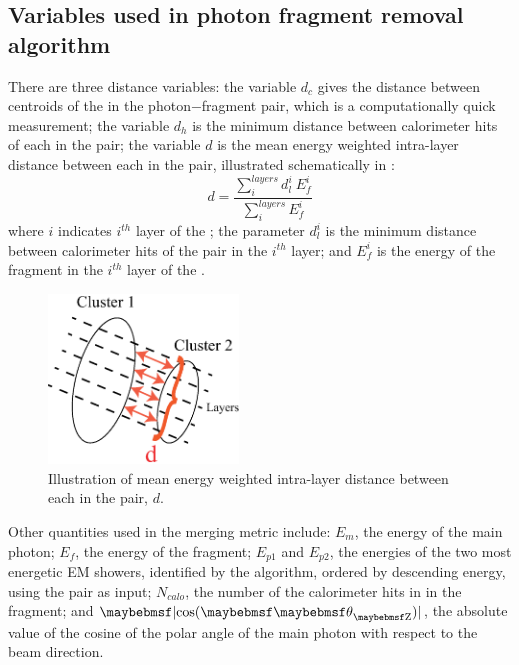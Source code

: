 \subsection{Variables used in photon fragment removal algorithm}

There are three distance variables: the variable $d_c$ gives the distance between centroids of the \PFO in the photon$-$fragment pair, which is a computationally quick measurement;  the variable  $d_h$ is the minimum distance between calorimeter hits of each \PFO in the pair;  the variable  $d$ is the mean energy weighted intra-layer distance between  each \PFO in the pair, illustrated schematically in :
\begin{equation}
d = \frac{\sum_{i}^{layers}d_l^i \ E_{f}^i}{\sum_{i}^{layers}E_{f}^i}
\end{equation}
where $i$ indicates $i^{th}$ layer of the \ECAL; the parameter $d_{l}^i$ is the minimum distance between calorimeter hits of the pair in the $i^{th}$ layer; and $E_{f}^i$ is the energy of the fragment in the $i^{th}$ layer of the \ECAL. 

\begin{figure}[tbph]
\centering
\includegraphics[width=0.45\textwidth]{photon/dLayer2}
\caption{Illustration of  mean energy weighted intra-layer distance between  each \PFO in the pair, $d$.}
\label{fig:photonDistanceMetric}
\end{figure}

Other quantities used in the merging metric include: $E_m$, the energy of the main photon; $E_f$,  the energy of the fragment; $E_{p1}$ and $E_{p2}$, the energies of the two most energetic EM showers,  identified by the \peakFinding algorithm, ordered by descending energy, using the pair as input; $N_{calo}$, the number of the calorimeter  hits in \ECAL in the fragment; and $\absCosTheta$, the absolute value of the cosine of the polar angle of the main photon with respect to the beam direction.


